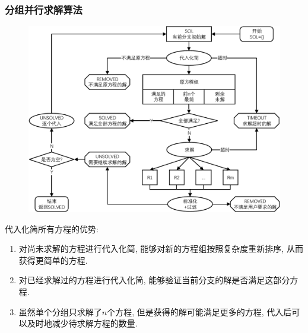 \begin{frame}
\frametitle{分组并行求解算法}
\begin{figure}
\centering
\includegraphics[height=0.8\textheight]{../paper/fig/pgsolve.pdf}
\end{figure}
\end{frame}

\begin{frame}
代入化简所有方程的优势:
\begin{enumerate}
\item 对尚未求解的方程进行代入化简, 能够对新的方程组按照复杂度重新排序, 从而获得更简单的方程.
\item 对已经求解过的方程进行代入化简, 能够验证当前分支的解是否满足这部分方程. 
\item 虽然单个分组只求解了$n$个方程, 但是获得的解可能满足更多的方程, 代入后可以及时地减少待求解方程的数量. 
\end{enumerate}
\end{frame}

